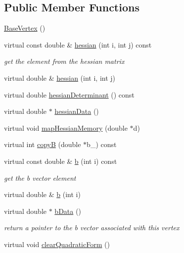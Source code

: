 \subsection*{Public Member Functions}
\begin{DoxyCompactItemize}
\item 
\hyperlink{classg2o_1_1BaseVertex_a40fcd78e21bb4aedf7e299922c650937}{Base\+Vertex} ()
\item 
virtual const double \& \hyperlink{classg2o_1_1BaseVertex_ac591409722e675a3b69b9157fb5c7933}{hessian} (int i, int j) const 
\begin{DoxyCompactList}\small\item\em get the element from the hessian matrix \end{DoxyCompactList}\item 
virtual double \& \hyperlink{classg2o_1_1BaseVertex_a6ab2212fdb00dec460299fdbabe09cb9}{hessian} (int i, int j)
\item 
virtual double \hyperlink{classg2o_1_1BaseVertex_a4f302a5d56f733a93fe5e98b49a20a07}{hessian\+Determinant} () const 
\item 
virtual double $\ast$ \hyperlink{classg2o_1_1BaseVertex_aedf92fbb5c2c86185422a955be02a3a6}{hessian\+Data} ()
\item 
virtual void \hyperlink{classg2o_1_1BaseVertex_a54227ac315e6bc75c63ed117a2c75668}{map\+Hessian\+Memory} (double $\ast$d)
\item 
virtual int \hyperlink{classg2o_1_1BaseVertex_ae9d3f6d4ac4effb78df958df30204c5b}{copyB} (double $\ast$b\+\_\+) const 
\item 
virtual const double \& \hyperlink{classg2o_1_1BaseVertex_ae50dec87bfcb6a874ba87512c61bada7}{b} (int i) const 
\begin{DoxyCompactList}\small\item\em get the b vector element \end{DoxyCompactList}\item 
virtual double \& \hyperlink{classg2o_1_1BaseVertex_a5c235369ef3fb58de65b90c8cc37d611}{b} (int i)
\item 
virtual double $\ast$ \hyperlink{classg2o_1_1BaseVertex_ac8edea7073e5850c90b0ba37092b8f84}{b\+Data} ()
\begin{DoxyCompactList}\small\item\em return a pointer to the b vector associated with this vertex \end{DoxyCompactList}\item 
virtual void \hyperlink{classg2o_1_1BaseVertex_a144f99c7aa36a100dea65b30793e6d76}{clear\+Quadratic\+Form} ()

\end{DoxyCompactItemize}
